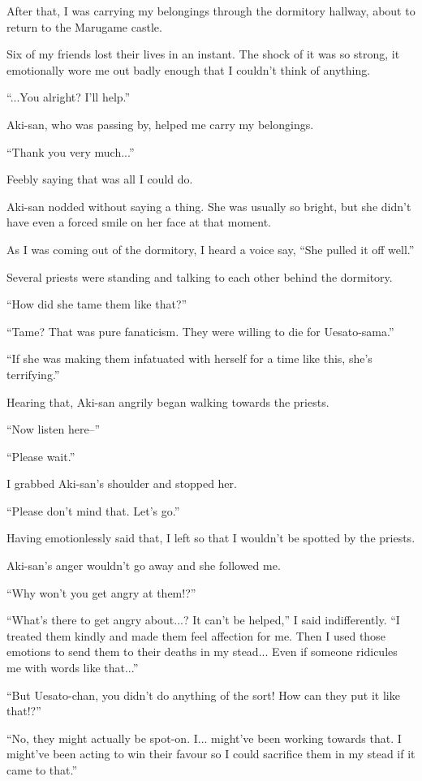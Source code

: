 After that, I was carrying my belongings through the dormitory hallway, about to return to the Marugame castle.

Six of my friends lost their lives in an instant. The shock of it was so strong, it emotionally wore me out badly enough that I couldn't think of anything.

``...You alright? I'll help.''

Aki-san, who was passing by, helped me carry my belongings.

``Thank you very much...''

Feebly saying that was all I could do.

Aki-san nodded without saying a thing. She was usually so bright, but she didn't have even a forced smile on her face at that moment.

As I was coming out of the dormitory, I heard a voice say, ``She pulled it off well.''

Several priests were standing and talking to each other behind the dormitory.

``How did she tame them like that?''

``Tame? That was pure fanaticism. They were willing to die for Uesato-sama.''

``If she was making them infatuated with herself for a time like this, she's terrifying.''

Hearing that, Aki-san angrily began walking towards the priests.

``Now listen here--''

``Please wait.''

I grabbed Aki-san's shoulder and stopped her.

``Please don't mind that. Let's go.''

Having emotionlessly said that, I left so that I wouldn't be spotted by the priests.

Aki-san's anger wouldn't go away and she followed me.

``Why won't you get angry at them!?''

``What's there to get angry about...? It can't be helped,'' I said indifferently.  ``I treated them kindly and made them feel affection for me. Then I used those emotions to send them to their deaths in my stead... Even if someone ridicules me with words like that...''

``But Uesato-chan, you didn't do anything of the sort! How can they put it like that!?''

``No, they might actually be spot-on. I... might've been working towards that. I might've been acting to win their favour so I could sacrifice them in my stead if it came to that.''

